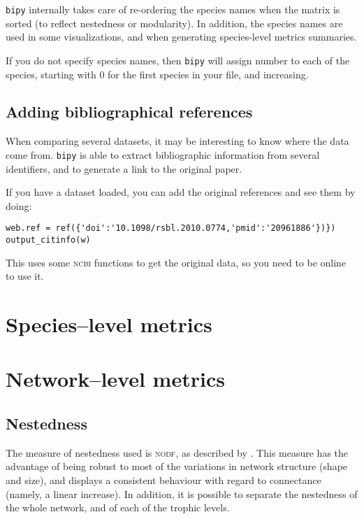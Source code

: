 \documentclass[10pt]{scrbook}
\begin{document}
\texttt{bipy} internally takes care of re-ordering the species names when the matrix is sorted (to reflect nestedness or modularity). In addition, the species names are used in some visualizations, and when generating species-level metrics summaries. 

If you do not specify species names, then \texttt{bipy} will assign number to each of the species, starting with 0 for the first species in your file, and increasing.

\section{Adding bibliographical references}

When comparing several datasets, it may be interesting to know where the data come from. \texttt{bipy} is able to extract bibliographic information from several identifiers, and to generate a link to the original paper.

If you have a dataset loaded, you can add the original references and see them by doing:

\begin{lstlisting}[caption=attributing a reference]
web.ref = ref({'doi':'10.1098/rsbl.2010.0774,'pmid':'20961886'})})
output_citinfo(w)
\end{lstlisting}

This uses some \textsc{ncbi} functions to get the original data, so you need to be online to use it. 

\chapter{Species--level metrics}

\chapter{Network--level metrics}

\section{Nestedness}

The measure of nestedness used is \textsc{nodf}, as described by \citet{Almeida-Neto2008}. This measure has the advantage of being robust to most of the variations in network structure (shape and size), and displays a consistent behaviour with regard to connectance (namely, a linear increase). In addition, it is possible to separate the nestedness of the whole network, and of each of the trophic levels.
\end{document}
